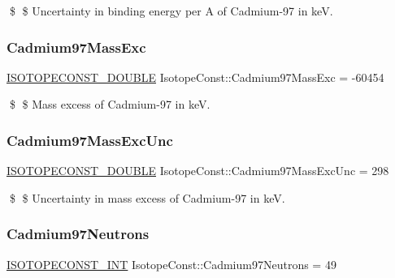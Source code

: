 \$ \$ Uncertainty in binding energy per A of Cadmium-\/97 in keV. \mbox{\label{group___isotope_const-_cadmium-_cd97_ga0db4dc41562f16f0046d818d516424a1}} 
\subsubsection{\texorpdfstring{Cadmium97\+Mass\+Exc}{Cadmium97MassExc}}
{\footnotesize\ttfamily \mbox{\hyperlink{group___isotope_const-_macros_ga8f45a7272ce02c0b4c65c44636ed719a}{I\+S\+O\+T\+O\+P\+E\+C\+O\+N\+S\+T\+\_\+\+D\+O\+U\+B\+LE}} Isotope\+Const\+::\+Cadmium97\+Mass\+Exc = -\/60454}

\$ \$ Mass excess of Cadmium-\/97 in keV. \mbox{\label{group___isotope_const-_cadmium-_cd97_ga51044e94c5524cb530ecd613d4ca068d}} 
\subsubsection{\texorpdfstring{Cadmium97\+Mass\+Exc\+Unc}{Cadmium97MassExcUnc}}
{\footnotesize\ttfamily \mbox{\hyperlink{group___isotope_const-_macros_ga8f45a7272ce02c0b4c65c44636ed719a}{I\+S\+O\+T\+O\+P\+E\+C\+O\+N\+S\+T\+\_\+\+D\+O\+U\+B\+LE}} Isotope\+Const\+::\+Cadmium97\+Mass\+Exc\+Unc = 298}

\$ \$ Uncertainty in mass excess of Cadmium-\/97 in keV. \mbox{\label{group___isotope_const-_cadmium-_cd97_ga2cf5db66dff6446d2d496ff14810aa23}} 
\subsubsection{\texorpdfstring{Cadmium97\+Neutrons}{Cadmium97Neutrons}}
{\footnotesize\ttfamily \mbox{\hyperlink{group___isotope_const-_macros_ga5f18360b3e99483a35c32d789e62621c}{I\+S\+O\+T\+O\+P\+E\+C\+O\+N\+S\+T\+\_\+\+I\+NT}} Isotope\+Const\+::\+Cadmium97\+Neutrons = 49}

